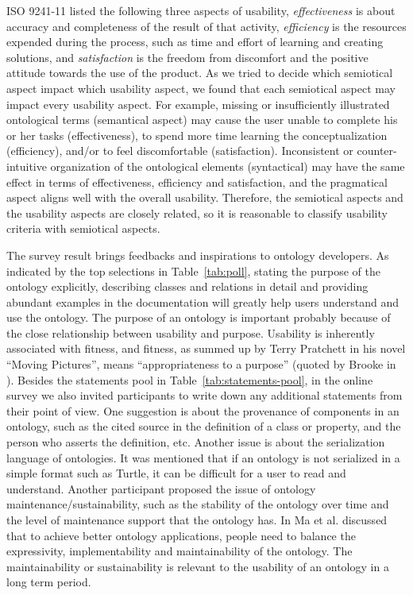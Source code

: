 ISO 9241-11 \cite{iso19989241} listed the following three aspects of usability, \emph{effectiveness} is about accuracy and completeness of the result of that activity, \emph{efficiency} is the resources expended during the process, such as time and effort of learning and creating solutions, and \emph{satisfaction} is the freedom from discomfort and the positive attitude towards the use of the product. As we tried to decide which semiotical aspect impact which usability aspect, we found that each semiotical aspect may impact every usability aspect. For example, missing or insufficiently illustrated ontological terms (semantical aspect) may cause the user unable to complete his or her tasks (effectiveness), to spend more time learning the conceptualization (efficiency), and/or to feel discomfortable (satisfaction). Inconsistent or counter-intuitive organization of the ontological elements (syntactical) may have the same effect in terms of effectiveness, efficiency and satisfaction, and the pragmatical aspect aligns well with the overall usability. Therefore, the semiotical aspects and the usability aspects are closely related, so it is reasonable to classify usability criteria with semiotical aspects.

The survey result brings feedbacks and inspirations to ontology developers. As indicated by the top selections in Table~\ref{tab:poll}, stating the purpose of the ontology explicitly, describing classes and relations in detail and providing abundant examples in the documentation will greatly help users understand and use the ontology. The purpose of an ontology is important probably because of the close relationship between usability and purpose. Usability is inherently associated with fitness, and fitness, as summed up by Terry Pratchett in his novel ``Moving Pictures'', means ``appropriateness to a purpose'' \cite{pratchett2005moving} (quoted by Brooke in \cite{brooke1996sus}). Besides the statements pool in Table~\ref{tab:statements-pool}, in the online survey we also invited participants to write down any additional statements from their point of view. One suggestion is about the provenance of components in an ontology, such as the cited source in the definition of a class or property, and the person who asserts the definition, etc. Another issue is about the serialization language of ontologies. It was mentioned that if an ontology is not serialized in a simple format such as Turtle, it can be difficult for a user to read and understand. Another participant proposed the issue of ontology maintenance/sustainability, such as the stability of the ontology over time and the level of maintenance support that the ontology has. In \cite{ma2013recent} Ma et al. discussed that to achieve better ontology applications, people need to balance the expressivity, implementability and maintainability of the ontology. The maintainability or sustainability is relevant to the usability of an ontology in a long term period.

